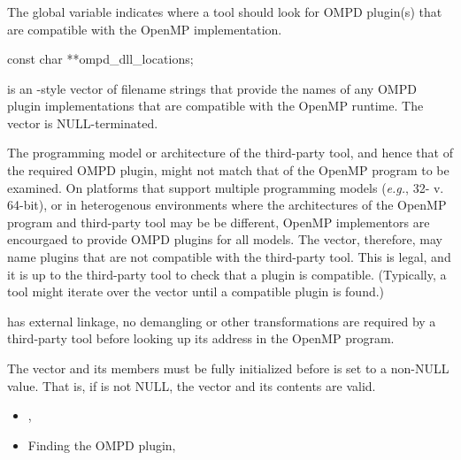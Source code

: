 \subsubsection{}
\label{subsubsec:ompd_dll_locations}

\summary
The global variable  indicates
where a tool should look for OMPD plugin(s) that are compatible
with the OpenMP implementation.

\begin{cspecific}
\begin{ompSyntax}
const char **ompd_dll_locations;
\end{ompSyntax}
\end{cspecific}


\descr
{} is an -style vector of filename
strings that provide the names of any OMPD plugin implementations
that are compatible with the OpenMP runtime.
The vector is NULL-terminated.

The programming model or architecture of the third-party tool, and
hence that of the required OMPD plugin, might not match that of
the OpenMP program to be examined.
On platforms that support multiple programming models (\textit{e.g.},
32- v. 64-bit), or in heterogenous  environments where the architectures
of the OpenMP program and third-party tool may be be different,
OpenMP implementors are encourgaed to provide OMPD plugins for all models.
The vector, therefore, may name plugins that are not compatible
with the third-party tool.
This is legal, and it is up to the third-party tool to check that
a plugin is compatible.
(Typically, a tool might iterate over the vector until a compatible
plugin is found.)

\restrictions
{} has external  linkage,
no demangling or other transformations are required by a third-party
tool before looking up its address in the OpenMP program.

The vector and its members must be fully initialized before
 is set to a non-NULL value.
That is, if  is not NULL, the vector
and its contents are valid.

\crossreferences
\begin{itemize}
\item
  , 
\item
  Finding the OMPD plugin, 
\end{itemize}

